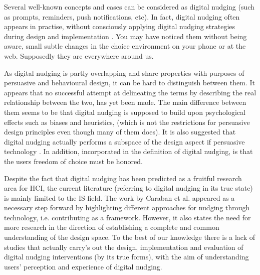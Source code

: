 Several well-known concepts and cases can be considered as digital nudging (such as prompts, reminders, push notifications, etc). In fact, digital nudging often appears in practise, without consciously applying digital nudging strategies during design and implementation \cite{schneider_digital_2018}.
You may have noticed them without being aware, small subtle changes in the choice environment on your phone or at the web. Supposedly they are everywhere around us. 

As digital nudging is partly overlapping and share properties with purposes of persuasive and behavioural design, it can be hard to distinguish between them. It appears that no successful attempt at delineating the terms by describing the real relationship between the two, has yet been made. The main difference between them seems to be that digital nudging is supposed to build upon psychological effects such as biases and heuristics\cite{mirsch_making_2018},
(which is not the restrictions for persuasive design principles even though many of them does). It is also suggested that digital nudging actually performs a subspace of the design aspect if persuasive technology
\cite{schneider_digital_2018}. 
In addition, incorporated in the definition of digital nudging, is that the users freedom of choice must be honored. 



Despite the fact that digital nudging has been predicted as a fruitful research area for HCI\cite{mirsch_digital_2017},
the current literature (referring to digital nudging in its true state) is mainly limited to the IS field. The work by Caraban et al. appeared as a necessary step forward by highlighting different approaches for nudging through technology, i.e. contributing as a framework. However, it also states the need for more research in the direction of establishing a complete and common understanding of the design space. To the best of our knowledge there is a lack of studies that actually carry's out the design, implementation and evaluation  of digital nudging interventions (by its true forms), with the aim of understanding users' perception and experience of digital nudging.

